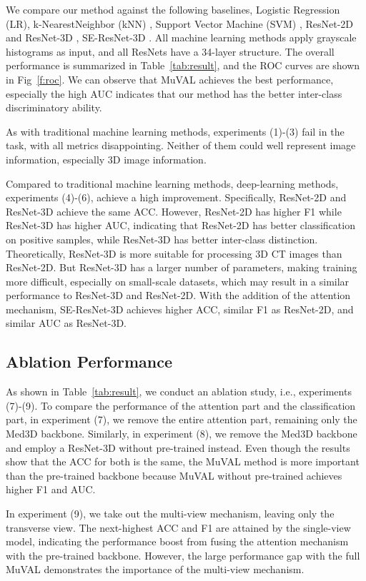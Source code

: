 We compare our method against the following baselines, Logistic Regression (LR), k-NearestNeighbor (kNN) \cite{cover1967nearest}, Support Vector Machine (SVM) \cite{cortes1995support}, ResNet-2D and ResNet-3D \cite{he2016deep}, SE-ResNet-3D \cite{hu2018squeeze}. All machine learning methods apply grayscale histograms as input, and all ResNets have a 34-layer structure. The overall performance is summarized in Table~\ref{tab:result}, and the ROC curves are shown in Fig~\ref{f:roc}. We can observe that MuVAL achieves the best performance, especially the high AUC indicates that our method has the better inter-class discriminatory ability.

As with traditional machine learning methods, experiments (1)-(3) fail in the task, with all metrics disappointing. Neither of them could well represent image information, especially 3D image information.

Compared to traditional machine learning methods, deep-learning methods, experiments (4)-(6), achieve a high improvement. Specifically, ResNet-2D and ResNet-3D achieve the same ACC. However, ResNet-2D has higher F1 while ResNet-3D has higher AUC, indicating that ResNet-2D has better classification on positive samples, while ResNet-3D has better inter-class distinction. Theoretically, ResNet-3D is more suitable for processing 3D CT images than ResNet-2D. But ResNet-3D has a larger number of parameters, making training more difficult, especially on small-scale datasets, which may result in a similar performance to ResNet-3D and ResNet-2D. With the addition of the attention mechanism, SE-ResNet-3D achieves higher ACC, similar F1 as ResNet-2D, and similar AUC as ResNet-3D. 

\subsection{Ablation Performance}
As shown in Table~\ref{tab:result}, we conduct an ablation study, i.e., experiments (7)-(9).
To compare the performance of the attention part and the classification part, in experiment (7), we remove the entire attention part, remaining only the Med3D backbone.
Similarly, in experiment (8), we remove the Med3D backbone and employ a ResNet-3D without pre-trained instead. 
Even though the results show that the ACC for both is the same, the MuVAL method is more important than the pre-trained backbone because MuVAL without pre-trained achieves higher F1 and AUC.

In experiment (9), we take out the multi-view mechanism, leaving only the transverse view. 
The next-highest ACC and F1 are attained by the single-view model, indicating the performance boost from fusing the attention mechanism with the pre-trained backbone.
However, the large performance gap with the full MuVAL demonstrates the importance of the multi-view mechanism.

